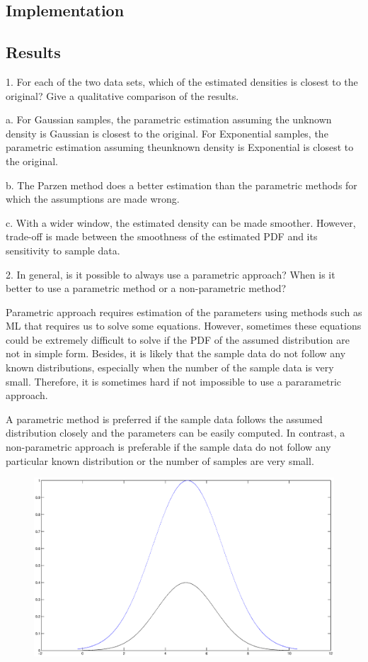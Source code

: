 \label{sec:1d}
\subsection{Implementation}


\subsection{Results}
1. For each of the two data sets, which of the estimated densities is closest
to the original? Give a qualitative comparison of the results.

a. For Gaussian samples, the parametric estimation assuming the unknown density
is Gaussian is closest to the original. For Exponential samples, the parametric
estimation assuming theunknown density is Exponential is closest to the original.

b. The Parzen method does a better estimation than the parametric methods for
which the assumptions are made wrong.

c. With a wider window, the estimated density can be made smoother. However,
trade-off is made between the smoothness of the estimated PDF and its
sensitivity to sample data.

2. In general, is it possible to always use a parametric approach? When is it
better to use a parametric method or a non-parametric method?

Parametric approach requires estimation of the parameters using methods such as
ML that requires us to solve some equations. However, sometimes these equations
could be extremely difficult to solve if the PDF of the assumed distribution
are not in simple form. Besides, it is likely that the sample data do not
follow any known distributions, especially when the number of the sample data
is very small. Therefore, it is sometimes hard if not impossible to use a
pararametric approach.

A parametric method is preferred if the sample data follows the assumed
distribution closely and the parameters can be easily computed. In contrast, a
non-parametric approach is preferable if the sample data do not follow any
particular known distribution or the number of samples are very small.


\begin{figure}
\label{}
\includegraphics[scale=0.4]{gauss-gauss}
\caption{}
\end{figure}

